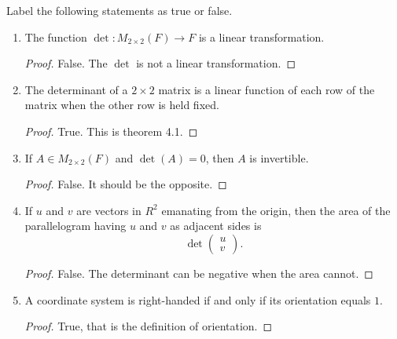\documentclass[12pt, a4paper]{article}
\theoremstyle{plain}
\begin{document}
\begin{exercise}{4.1}
Label the following statements as true or false.
	\begin{enumerate}[label=(\alph*)]
	\item The function $\det :M_{2\times 2}(F)\rightarrow F$ is a linear transformation.
		\begin{proof}
		False. The $\det$ is not a linear transformation.
		\end{proof}
	\item The determinant of a $2\times 2$ matrix is a linear function of each row of the matrix when the other row is held fixed.
		\begin{proof}
		True. This is theorem 4.1.
		\end{proof}
	\item If $A\in M_{2\times 2}(F)$ and $\det (A)=0$, then $A$ is invertible.
		\begin{proof}
		False. It should be the opposite.
		\end{proof}
	\item If $u$ and $v$ are vectors in $R^2$ emanating from the origin, then the area of the parallelogram having $u$ and $v$ as adjacent sides is 
	\[
	\det\begin{pmatrix}
	u\\
	v
	\end{pmatrix}.
	\]
		\begin{proof}
		False. The determinant can be negative when the area cannot.
		\end{proof}
	\item A coordinate system is right-handed if and only if its orientation equals $1$.
		\begin{proof}
		True, that is the definition of orientation.
		\end{proof}
	\end{enumerate}
\end{exercise}

\pagebreak
\end{document}
